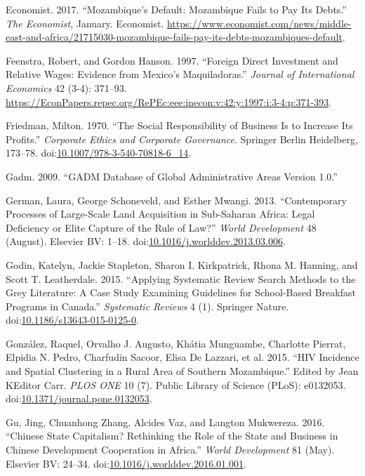 \documentclass[]{article}
\begin{document}
\hypertarget{ref-Economist2017}{}
Economist. 2017. ``Mozambique's Default: Mozambique Fails to Pay Its
Debts.'' \emph{The Economist}, January. Economist.
\url{https://www.economist.com/news/middle-east-and-africa/21715030-mozambique-fails-pay-its-debts-mozambiques-default}.

\hypertarget{ref-Feenstra}{}
Feenstra, Robert, and Gordon Hanson. 1997. ``Foreign Direct Investment
and Relative Wages: Evidence from Mexico's Maquiladoras.'' \emph{Journal
of International Economics} 42 (3-4): 371--93.
\url{https://EconPapers.repec.org/RePEc:eee:inecon:v:42:y:1997:i:3-4:p:371-393}.

\hypertarget{ref-Friedman}{}
Friedman, Milton. 1970. ``The Social Responsibility of Business Is to
Increase Its Profits.'' \emph{Corporate Ethics and Corporate
Governance}. Springer Berlin Heidelberg, 173--78.
doi:\href{https://doi.org/10.1007/978-3-540-70818-6_14}{10.1007/978-3-540-70818-6\_14}.

\hypertarget{ref-gadm}{}
Gadm. 2009. ``GADM Database of Global Administrative Areas Version
1.0.''

\hypertarget{ref-German2013}{}
German, Laura, George Schoneveld, and Esther Mwangi. 2013.
``Contemporary Processes of Large-Scale Land Acquisition in Sub-Saharan
Africa: Legal Deficiency or Elite Capture of the Rule of Law?''
\emph{World Development} 48 (August). Elsevier BV: 1--18.
doi:\href{https://doi.org/10.1016/j.worlddev.2013.03.006}{10.1016/j.worlddev.2013.03.006}.

\hypertarget{ref-Godin2015}{}
Godin, Katelyn, Jackie Stapleton, Sharon I. Kirkpatrick, Rhona M.
Hanning, and Scott T. Leatherdale. 2015. ``Applying Systematic Review
Search Methods to the Grey Literature: A Case Study Examining Guidelines
for School-Based Breakfast Programs in Canada.'' \emph{Systematic
Reviews} 4 (1). Springer Nature.
doi:\href{https://doi.org/10.1186/s13643-015-0125-0}{10.1186/s13643-015-0125-0}.

\hypertarget{ref-Gonz_lez_2015}{}
González, Raquel, Orvalho J. Augusto, Khátia Munguambe, Charlotte
Pierrat, Elpidia N. Pedro, Charfudin Sacoor, Elisa De Lazzari, et al.
2015. ``HIV Incidence and Spatial Clustering in a Rural Area of Southern
Mozambique.'' Edited by Jean KEditor Carr. \emph{PLOS ONE} 10 (7).
Public Library of Science (PLoS): e0132053.
doi:\href{https://doi.org/10.1371/journal.pone.0132053}{10.1371/journal.pone.0132053}.

\hypertarget{ref-Gu_2016}{}
Gu, Jing, Chuanhong Zhang, Alcides Vaz, and Langton Mukwereza. 2016.
``Chinese State Capitalism? Rethinking the Role of the State and
Business in Chinese Development Cooperation in Africa.'' \emph{World
Development} 81 (May). Elsevier BV: 24--34.
doi:\href{https://doi.org/10.1016/j.worlddev.2016.01.001}{10.1016/j.worlddev.2016.01.001}.
\end{document}
